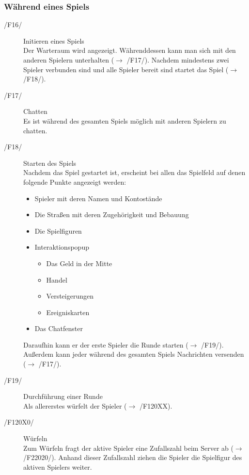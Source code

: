 \documentclass[a4paper,10pt]{article}
\begin{document}
\subsubsection{Während eines Spiels}
\begin{description}
\item[/F16/] Initieren eines Spiels \\
Der Warteraum wird angezeigt. Währenddessen kann man sich mit den anderen Spielern unterhalten ($\rightarrow$ /F17/). Nachdem mindestens zwei Spieler verbunden sind und alle Spieler bereit sind startet das Spiel ($\rightarrow$ /F18/).
\item[/F17/] Chatten \\
Es ist während des gesamten Spiels möglich mit anderen Spielern zu chatten.
\item[/F18/] Starten des Spiels \\
Nachdem das Spiel gestartet ist, erscheint bei allen das Spielfeld auf denen folgende Punkte angezeigt werden:
\begin{itemize}
\item Spieler mit deren Namen und Kontostände
\item Die Straßen mit deren Zugehörigkeit und Bebauung
\item Die Spielfiguren
\item Interaktionspopup
\begin{itemize}
\item Das Geld in der Mitte
\item Handel
\item Versteigerungen
\item Ereigniskarten
\end{itemize}
\item Das Chatfenster
\end{itemize}
Daraufhin kann er der erste Spieler die Runde starten ($\rightarrow$ /F19/). Außerdem kann jeder während des gesamten Spiels Nachrichten versenden ($\rightarrow$ /F17/).
\item[/F19/] Durchführung einer Runde \\
Als allererstes würfelt der Spieler ($\rightarrow$ /F120XX).
\item[/F120X0/] Würfeln \\
Zum Würfeln fragt der aktive Spieler eine Zufallszahl beim Server ab ($\rightarrow$ /F22020/). Anhand dieser Zufallszahl ziehen die Spieler die Spielfigur des aktiven Spielers weiter.


\end{description}
\end{document}
